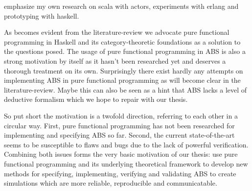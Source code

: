 emphasize my own research on scala with actors, experiments with erlang and prototyping with haskell.

As becomes evident from the literature-review we advocate pure functional programming in Haskell and its category-theoretic foundations as a solution to the questions posed. The usage of pure functional programming in ABS is also a strong motivation by itself as it hasn't been researched yet and deserves a thorough treatment on its own. Surprisingly there exist hardly any attempts on implementing ABS in pure functional programming as will become clear in the literature-review. Maybe this can also be seen as a hint that ABS lacks a level of deductive formalism which we hope to repair with our thesis. 

So put short the motivation is a twofold direction, referring to each other in a circular way. First, pure functional programming has not been researched for implementing and specifying ABS so far. Second,  the current state-of-the-art seems to be susceptible to flaws and bugs due to the lack of powerful verification. Combining both issues forms the very basic motivation of our thesis: use pure functional programming and its underlying theoretical framework to develop new methods for specifying, implementing, verifying and validating ABS to create simulations which are more reliable, reproducible and communicatable.

